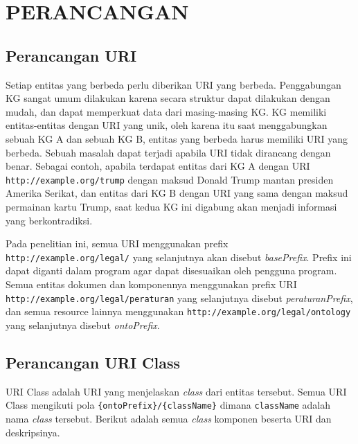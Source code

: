 \chapter{PERANCANGAN}
\label{bab:4}

\section{Perancangan URI}\label{perancangan-uri}

Setiap entitas yang berbeda perlu diberikan URI yang berbeda. Penggabungan KG sangat umum dilakukan
karena secara struktur dapat dilakukan dengan mudah, dan dapat memperkuat data dari masing-masing
KG. KG memiliki entitas-entitas dengan URI yang unik, oleh karena itu saat menggabungkan sebuah KG A
dan sebuah KG B, entitas yang berbeda harus memiliki URI yang berbeda. Sebuah masalah dapat terjadi
apabila URI tidak dirancang dengan benar. Sebagai contoh, apabila terdapat entitas dari KG A dengan
URI \texttt{http://example.org/trump} dengan maksud Donald Trump mantan presiden Amerika Serikat,
dan entitas dari KG B dengan URI yang sama dengan maksud permainan kartu Trump, saat kedua KG ini
digabung akan menjadi informasi yang berkontradiksi.

Pada penelitian ini, semua URI menggunakan prefix \texttt{http://example.org/legal/} yang
selanjutnya akan disebut \emph{basePrefix}. Prefix ini dapat diganti dalam program agar dapat
disesuaikan oleh pengguna program. Semua entitas dokumen dan komponennya menggunakan prefix URI
\texttt{http://example.org/legal/peraturan} yang selanjutnya disebut \emph{peraturanPrefix}, dan
semua resource lainnya menggunakan \texttt{http://example.org/legal/ontology} yang selanjutnya
disebut \emph{ontoPrefix}.

\section{Perancangan URI Class}\label{perancangan-uri-class}

URI Class adalah URI yang menjelaskan \emph{class} dari entitas tersebut. Semua URI Class mengikuti
pola \texttt{\{ontoPrefix\}/\{className\}} dimana \texttt{className} adalah nama \emph{class}
tersebut. Berikut adalah semua \emph{class} komponen beserta URI dan deskripsinya.

